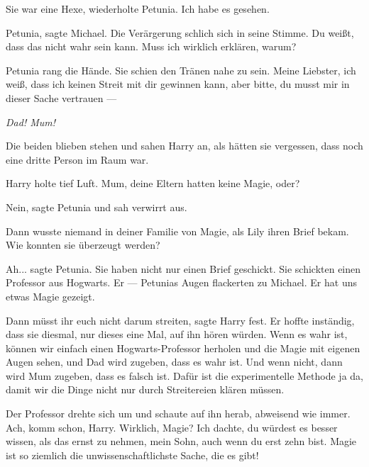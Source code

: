 \glqq Sie war eine Hexe\grqq{}, wiederholte Petunia. \glqq Ich habe es
gesehen.\grqq{}

\glqq Petunia\grqq{}, sagte Michael. Die Verärgerung schlich sich in seine
Stimme. \glqq Du weißt, dass das nicht wahr sein kann. Muss ich wirklich
erklären, warum?\grqq{}

Petunia rang die Hände. Sie schien den Tränen nahe zu sein. \glqq Meine
Liebster, ich weiß, dass ich keinen Streit mit dir gewinnen kann, aber bitte, du
musst mir in dieser Sache vertrauen ---\grqq{}

\glqq \emph{Dad! Mum!}\grqq{}

Die beiden blieben stehen und sahen Harry an, als hätten sie vergessen, dass
noch eine dritte Person im Raum war.

Harry holte tief Luft. \glqq Mum, deine Eltern hatten keine Magie, oder?\grqq{}

\glqq Nein\grqq{}, sagte Petunia und sah verwirrt aus.

\glqq Dann wusste niemand in deiner Familie von Magie, als Lily ihren Brief
bekam. Wie konnten sie überzeugt werden?\grqq{}

\glqq Ah...\grqq{} sagte Petunia. \glqq Sie haben nicht nur einen Brief
geschickt. Sie schickten einen Professor aus Hogwarts. Er ---\grqq{} Petunias
Augen flackerten zu Michael. \glqq Er hat uns etwas Magie gezeigt.\grqq{}

\glqq Dann müsst ihr euch nicht darum streiten\grqq{}, sagte Harry fest. Er
hoffte inständig, dass sie diesmal, nur dieses eine Mal, auf ihn hören würden.
\glqq Wenn es wahr ist, können wir einfach einen Hogwarts-Professor herholen und
die Magie mit eigenen Augen sehen, und Dad wird zugeben, dass es wahr ist. Und
wenn nicht, dann wird Mum zugeben, dass es falsch ist. Dafür ist die
experimentelle Methode ja da, damit wir die Dinge nicht nur durch Streitereien
klären müssen.\grqq{}

Der Professor drehte sich um und schaute auf ihn herab, abweisend wie immer.
\glqq Ach, komm schon, Harry. Wirklich, Magie? Ich dachte, du würdest es besser
wissen, als das ernst zu nehmen, mein Sohn, auch wenn du erst zehn bist. Magie
ist so ziemlich die unwissenschaftlichste Sache, die es gibt!\grqq{}

